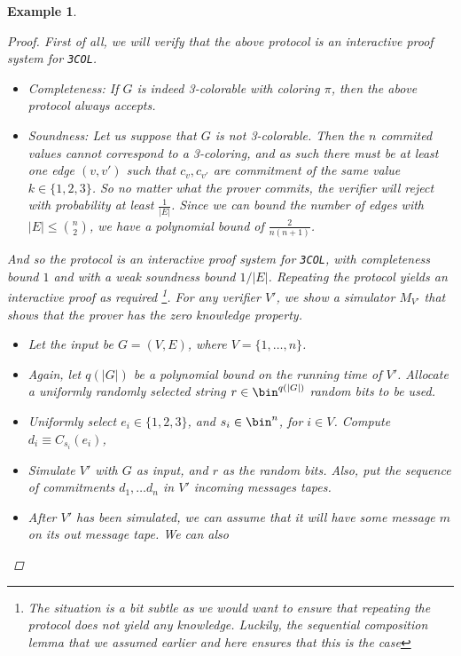 \documentclass{article}
\newtheorem{example}{Example}
\begin{document}
\begin{example}
    \begin{proof}
        First of all, we will verify that the above protocol is an interactive proof system for \texttt{3COL}.
        \begin{itemize}
            \item Completeness: If $G$ is indeed 3-colorable with coloring $\pi$, then the above protocol always accepts.
            \item Soundness: Let us suppose that $G$ is not 3-colorable. Then the $n$ commited values cannot 
                            correspond to a 3-coloring, and as such there must be at least one edge $(v, v')$ such that
                            $c_v, c_{v'}$ are commitment of the same value $k \in \{1, 2, 3\}$. So no matter what the 
                            prover commits, the verifier will reject with probability at least $\frac{1}{|E|}$. Since we can bound 
                            the number of edges with $|E| \leq \binom{n}{2}$, we have a polynomial bound of $\frac{2}{n(n+1)}$.
        \end{itemize}
        And so the protocol is an interactive proof system for \texttt{3COL}, with completeness bound $1$ and 
        with a weak soundness bound $1/|E|$. Repeating the protocol yields an interactive proof as required
        \footnote{The situation is a bit subtle as we would want to ensure that repeating the protocol does not yield any knowledge.
        Luckily, the sequential composition lemma that we assumed earlier and here ensures that this is the case}. 
        For any verifier $V'$, we show a simulator $M_{V'}$ that shows that the prover has the zero knowledge property.
        \begin{itemize}
            \item Let the input be $G = (V, E)$, where $V = \{1, \dots, n \}$.
            \item Again, let $q(|G|)$ be a polynomial bound on the running time of $V'$. Allocate a uniformly randomly selected string $r \in \bin^{q(|G|)}$ random bits to be used.
            \item Uniformly select $e_i \in \{1, 2, 3\}$, and $s_i \in \bin^n$, for $i \in V$. Compute $d_i \equiv C_{s_i}(e_i)$, 
            \item Simulate $V'$ with $G$ as input, and $r$ as the random bits. Also, put the sequence of commitments $d_1, \dots d_n$ in $V'$ incoming messages tapes.
            \item After $V'$ has been simulated, we can assume that it will have some message $m$ on its out message tape. We can also

\end{itemize}
\end{proof}
\end{example}
\end{document}
